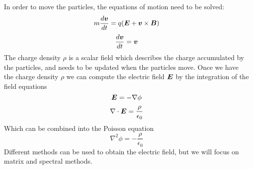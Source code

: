%
%
%
%
%


In order to move the particles, the equations of motion need to be solved:
%
\begin{equation}
m \frac{d\bm{v}}{dt} = q (\bm{E} + \bm{v} \times \bm{B})
\end{equation}
\begin{equation}
\frac{d\bm{v}}{dt}=\bm{v}
\end{equation}
%
The charge density $\rho$ is a scalar field which describes the charge 
accumulated by the particles, and needs to be updated when the particles move.
%
Once we have the charge density $\rho$ we can compute the electric field $\bm{E}$ by 
the integration of the field equations
%
\begin{equation}
\bm{E} = -\nabla \phi
\end{equation}
\begin{equation}
\nabla \cdot \bm{E} = \frac{\rho}{\epsilon_0}
\end{equation}
%
Which can be combined into the Poisson equation
%
\begin{equation}
\label{eq:poisson}
\nabla^2\phi = - \frac{\rho}{\epsilon_0}
\end{equation}
%
Different methods can be used to obtain the electric field, but we will focus on 
matrix and spectral methods.
